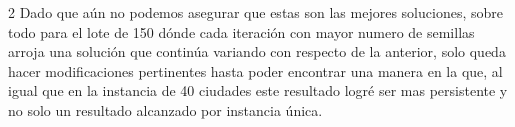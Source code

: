 \begin{multicols}{2}
Dado que aún no podemos asegurar que estas son las mejores soluciones, sobre todo para el lote de 150 dónde cada iteración con mayor numero de semillas arroja una solución que continúa variando con respecto de la anterior, solo queda hacer modificaciones pertinentes hasta poder encontrar una manera en la que, al igual que en la instancia de 40 ciudades este resultado logré ser mas persistente y no solo un resultado alcanzado por instancia única. 



\end{multicols}


